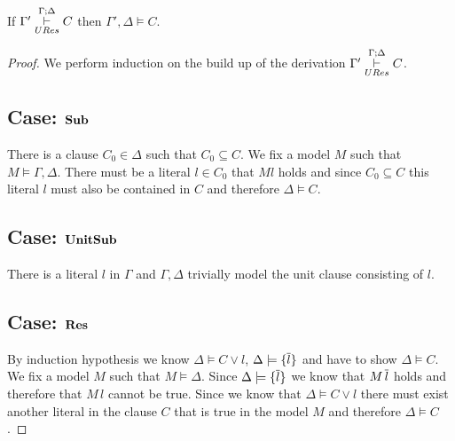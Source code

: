 \begin{mytheorem}\label{thm:UResSoundness}
If  $ \Gamma' \overset{\Gamma;\Delta}{\underset{URes}{\vdash}} C$ then $\Gamma', \Delta \models C$.
%
\begin{proof}
We perform induction on the build up of  the derivation $\Gamma' \overset{\Gamma;\Delta}{\underset{URes}{\vdash}} C$.
\subsection*{Case: $\mathbf{Sub}$}
%
There is a clause $C_0 \in \Delta$ such that $C_0 \subseteq C$. We fix a model $M$ such that $M \models \Gamma, \Delta $. There must be a literal $l \in C_0$ that $M l$ holds and since $C_0 \subseteq C$ this literal $l$ must also be contained in $C$ and therefore $\Delta \models C$.

\subsection*{Case: $\mathbf{UnitSub}$}
There is a literal $l$ in $\Gamma$ and $\Gamma,\Delta$ trivially model the unit clause consisting of $l$. 
%
\subsection*{Case: $\mathbf{Res}$}
By induction hypothesis we know $ \Delta \models C \vee l$, $ \Delta \models \{ \overline{l} \}$ and have to show $ \Delta \models C$. We fix a model $M$ such that $M \models \Delta$.  Since $ \Delta \models \{ \overline{l} \}$ we know that $M \, \overline{l}$ holds and therefore that $M \, l$ cannot be true. Since we know that $ \Delta \models C \vee l$ there must exist another literal in the clause $C$ that is true in the model $M$ and therefore $\Delta \models C$.
\end{proof}
\end{mytheorem}
%
